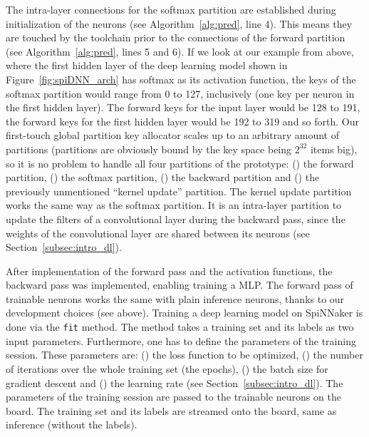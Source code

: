 \documentclass[]{article}
\begin{document}
The intra-layer connections for the softmax partition are established
during initialization of the neurons (see Algorithm~\ref{alg:pred},
line 4).
This means they are touched by the toolchain prior to the connections
of the forward partition (see Algorithm~\ref{alg:pred}, lines 5 and
6).
If we look at our example from above, where the first hidden layer
of the deep learning model shown in Figure~\ref{fig:spiDNN_arch} has
softmax as its activation function, the keys of the softmax partition
would range from 0 to 127, inclusively (one key per neuron in the
first hidden layer).
The forward keys for the input layer would be 128 to 191, the
forward keys for the first hidden layer would be 192 to 319 and so
forth.
Our first-touch global partition key allocator scales up to an
arbitrary amount of partitions (partitions are obviously bound by the
key space being $2^{32}$ items big), so it is no problem to handle all
four partitions of the prototype:
() the forward partition, () the
softmax partition, () the backward partition and
() the previously unmentioned ``kernel update''
partition.
The kernel update partition works the same way as the softmax
partition.
It is an intra-layer partition to update the filters of a
convolutional layer during the backward pass, since the weights of
the convolutional layer are shared between its neurons
(see Section~\ref{subsec:intro_dl}).

After implementation of the forward pass and the activation functions,
the backward pass was implemented, enabling training a MLP.
The forward pass of trainable neurons works the same with plain
inference neurons, thanks to our development choices (see above).
Training a deep learning model on SpiNNaker is done via the
\texttt{fit} method.
The method takes a training set and its labels as two input
parameters.
Furthermore, one has to define the parameters of the training session.
These parameters are: () the loss function to be
optimized, () the number of iterations over the whole
training set (the epochs), () the batch size for
gradient descent and () the learning rate
(see Section~\ref{subsec:intro_dl}).
The parameters of the training session are passed to the trainable
neurons on the board.
The training set and its labels are streamed onto the board, same as
inference (without the labels).
\end{document}

